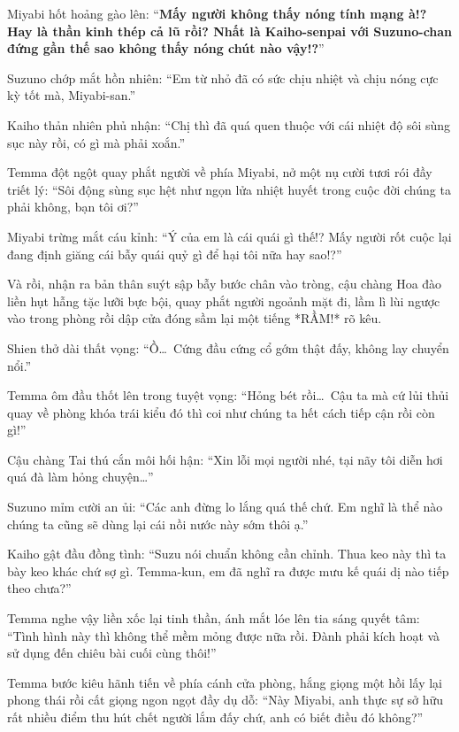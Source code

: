 \documentclass[../main.tex]{subfiles}
\begin{document}

Miyabi hốt hoảng gào lên: ``\textbf{Mấy người không thấy nóng tính mạng à!? Hay là thần kinh thép cả lũ rồi? Nhất là Kaiho-senpai với Suzuno-chan đứng gần thế sao không thấy nóng chút nào vậy!?}''

Suzuno chớp mắt hồn nhiên: ``Em từ nhỏ đã có sức chịu nhiệt và chịu nóng cực kỳ tốt mà, Miyabi-san.''

Kaiho thản nhiên phủ nhận: ``Chị thì đã quá quen thuộc với cái nhiệt độ sôi sùng sục này rồi, có gì mà phải xoắn.''

Temma đột ngột quay phắt người về phía Miyabi, nở một nụ cười tươi rói đầy triết lý: ``Sôi động sùng sục hệt như ngọn lửa nhiệt huyết trong cuộc đời chúng ta phải không, bạn tôi ơi?''

Miyabi trừng mắt cáu kỉnh: ``Ý của em là cái quái gì thế!? Mấy người rốt cuộc lại đang định giăng cái bẫy quái quỷ gì để hại tôi nữa hay sao!?''

Và rồi, nhận ra bản thân suýt sập bẫy bước chân vào tròng, cậu chàng Hoa đào liền hụt hẫng tặc lưỡi bực bội, quay phắt người ngoảnh mặt đi, lầm lì lùi ngược vào trong phòng rồi dập cửa đóng sầm lại một tiếng *RẦM!* rõ kêu.

Shien thở dài thất vọng: ``Ồ\dots\ Cứng đầu cứng cổ gớm thật đấy, không lay chuyển nổi.''

Temma ôm đầu thốt lên trong tuyệt vọng: ``Hỏng bét rồi\dots\ Cậu ta mà cứ lủi thủi quay về phòng khóa trái kiểu đó thì coi như chúng ta hết cách tiếp cận rồi còn gì!''

Cậu chàng Tai thú cắn môi hối hận: ``Xin lỗi mọi người nhé, tại nãy tôi diễn hơi quá đà làm hỏng chuyện\dots''

Suzuno mỉm cười an ủi: ``Các anh đừng lo lắng quá thế chứ. Em nghĩ là thể nào chúng ta cũng sẽ dùng lại cái nồi nước này sớm thôi ạ.''

Kaiho gật đầu đồng tình: ``Suzu nói chuẩn không cần chỉnh. Thua keo này thì ta bày keo khác chứ sợ gì. Temma-kun, em đã nghĩ ra được mưu kế quái dị nào tiếp theo chưa?''

Temma nghe vậy liền xốc lại tinh thần, ánh mắt lóe lên tia sáng quyết tâm: ``Tình hình này thì không thể mềm mỏng được nữa rồi. Đành phải kích hoạt và sử dụng đến chiêu bài cuối cùng thôi!''

\ct

Temma bước kiêu hãnh tiến về phía cánh cửa phòng, hắng giọng một hồi lấy lại phong thái rồi cất giọng ngon ngọt đầy dụ dỗ: ``Này Miyabi, anh thực sự sở hữu rất nhiều điểm thu hút chết người lắm đấy chứ, anh có biết điều đó không?''
\end{document}
